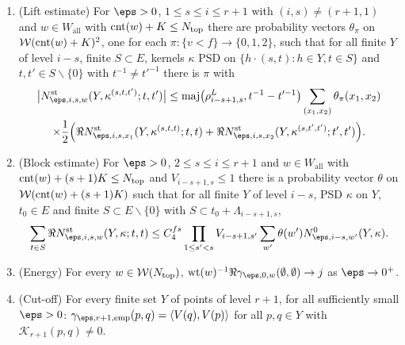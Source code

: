 \begin{definition}
\begin{enumerate}[label=(R\arabic*)]
\item\label{pf:thmS-carrier:R5} (Lift estimate) For $\eps>0$, $1\le s\le i\le r+1$ with $(i,s)\ne(r+1,1)$ and
  $w\in W_{\mathrm{all}}$ with $\operatorname{cnt}(w)+K\le N_{\mathrm{top}}$ there are probability vectors $\theta_\pi$ on
  $\mathcal{W}(\operatorname{cnt}(w)+K)^2$, one for each $\pi\colon\{v<f\}\to\{0,1,2\}$, such that for all finite $Y$ of
  level $i-s$, finite $S\subset E$, kernels $\kappa$ PSD on $\{h\cdot(s,t):h\in Y,t\in S\}$ and $t,t'\in
  S\smallsetminus\{0\}$ with $t^{-1}\ne t'^{-1}$ there is $\pi$ with
  \begin{multline*}
  \bigl|\thmScarrierNst_{\eps,i,s,w}(Y,\kappa^{(s,t,t')};t,t')\bigr|\le
  \thmScarrierMaj\bigl(\rho^L_{i-s+1,s},t^{-1}-t'^{-1}\bigr)\sum_{(x_1,x_2)}\theta_\pi(x_1,x_2)\\
  \times\frac12\Bigl(\Re\thmScarrierNst_{\eps,i,s,x_1}(Y,\kappa^{(s,t,t)};t,t)
  +\Re\thmScarrierNst_{\eps,i,s,x_2}(Y,\kappa^{(s,t',t')};t',t')\Bigr).
  \end{multline*}
\item\label{pf:thmS-carrier:R6} (Block estimate) For $\eps>0$, $2\le s\le i\le r+1$ and $w\in W_{\mathrm{all}}$ with
  $\operatorname{cnt}(w)+(s+1)K\le N_{\mathrm{top}}$ and $V_{i-s+1,s}\le1$ there is a probability vector $\theta$ on
  $\mathcal{W}(\operatorname{cnt}(w)+(s+1)K)$ such that for all finite $Y$ of level $i-s$, PSD $\kappa$ on $Y$, $t_0\in
  E$ and finite $S\subset E\smallsetminus\{0\}$ with $S\subset t_0+\Lambda_{i-s+1,s}$,
  \[
  \sum_{t\in S}\Re\thmScarrierNst_{\eps,i,s,w}(Y,\kappa;t,t)\le C_4^{fs}\prod_{1\le s'<s}V_{i-s+1,s'}\sum_{w'}
  \theta(w')\thmScarrierNz_{\eps,i-s,w'}(Y,\kappa).
  \]
\item\label{pf:thmS-carrier:R7} (Energy) For every $w\in\mathcal{W}(N_{\mathrm{top}})$,
  $\thmScarrierWt(w)^{-1}\Re\gamma_{\eps,0,w}(\emptyset,\emptyset)\to j$ as $\eps\to0^+$.
\item\label{pf:thmS-carrier:R8} (Cut-off) For every finite set $Y$ of points of level $r+1$, for all sufficiently small
  $\eps>0$: $\gamma_{\eps,r+1,\mathrm{emp}}(p,q)=\langle V(q),V(p)\rangle$ for all $p,q\in Y$ with
  $\mathcal K_{r+1}(p,q)\ne0$.
\end{enumerate}
\end{definition}

